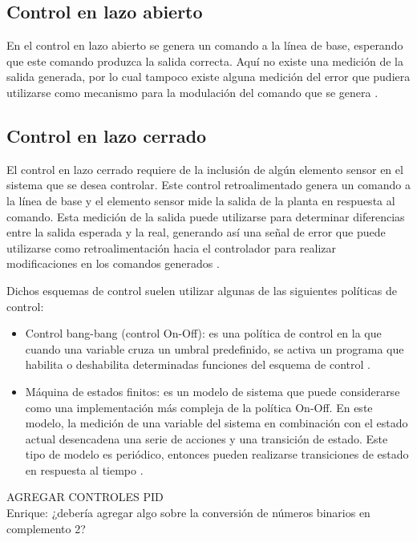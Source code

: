 \subsection{Control en lazo abierto}
En el control en lazo abierto se genera un comando a la línea de base, esperando que este comando produzca la salida correcta. Aquí no existe una medición de la salida generada, por lo cual tampoco existe alguna medición del error que pudiera utilizarse como mecanismo para la modulación del comando que se genera \cite{Wright2016}.

\subsection{Control en lazo cerrado}
El control en lazo cerrado requiere de la inclusión de algún elemento sensor en el sistema que se desea controlar. Este control retroalimentado genera un comando a la línea de base y el elemento sensor mide la salida de la planta en respuesta al comando. Esta medición de la salida puede utilizarse para determinar diferencias entre la salida esperada y la real, generando así una señal de error que puede utilizarse como retroalimentación hacia el controlador para realizar modificaciones en los comandos generados \cite{Wright2016}.

Dichos esquemas de control suelen utilizar algunas de las siguientes políticas de control:
\begin{itemize}
	\item Control bang-bang (control On-Off): es una política de control en la que cuando una variable cruza un umbral predefinido, se activa un programa que habilita o deshabilita determinadas funciones del esquema de control \cite{Wright2016}.
	\item Máquina de estados finitos: es un modelo de sistema que puede considerarse como una implementación más compleja de la política On-Off. En este modelo, la medición de una variable del sistema en combinación con el estado actual desencadena una serie de acciones y una transición de estado. Este tipo de modelo es periódico, entonces pueden realizarse transiciones de estado en respuesta al tiempo \cite{Wright2016}.
\end{itemize}

{\color{red}AGREGAR CONTROLES PID}\\
{\color{blue}Enrique: ¿debería agregar algo sobre la conversión de números binarios en complemento 2?}








